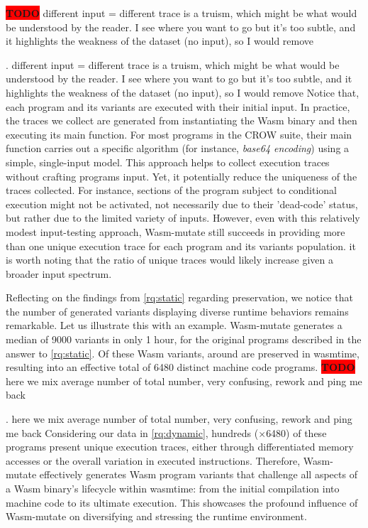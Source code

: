 \documentclass[sigplan,screen]{acmart}
\newcommand*\badge[1]{ \colorbox{red}{\color{white}#1}}
\newcommand{\tool}{Wasm-mutate\xspace}
\newcommand{\wasm}{Wasm\xspace}
\newcommand{\todo}[1]{%
\refstepcounter{todo}
\noindent\textbf{\badge{TODO}} {\color{red}#1}
\addcontentsline{td}{todo}
{\color{red}\thesection.\thetodo\xspace #1}}
\begin{document}
\todo{different input = different trace is a truism, which might be what would be understood by the reader. I see where you want to go but it's too subtle, and it highlights the weakness of the dataset (no input), so I would remove }
Notice that, each program and its variants are executed with their initial input.
In practice, the traces we collect are generated from instantiating the \wasm binary and then executing its main function. 
For most programs in the CROW suite, their main function carries out a specific algorithm (for instance, \emph{base64 encoding}) using a simple, single-input model. 
This approach helps to collect execution traces without crafting programs input.
Yet, it potentially reduce the uniqueness of the traces collected. 
For instance, sections of the program subject to conditional execution might not be activated, not necessarily due to their 'dead-code' status, but rather due to the limited variety of inputs. 
However, even with this relatively modest input-testing approach, \tool still succeeds in providing more than one unique execution trace for each program and its variants population.
it is worth noting that the ratio of unique traces would likely increase given a broader input spectrum.

Reflecting on the findings from \ref{rq:static} regarding preservation, we notice that the number of generated variants displaying diverse runtime behaviors remains remarkable. 
Let us illustrate this with an example.
\tool generates a median of 9000 variants in only 1 hour, for the original programs described in the answer to \ref{rq:static}. 
Of these \wasm variants, around \preserved are preserved in wasmtime, resulting into an effective total of 6480 distinct machine code programs.
\todo{here we mix average number of total number, very confusing, rework and ping me back}
Considering our data in \ref{rq:dynamic}, hundreds (\memratio$\times$6480) of these programs present unique execution traces, either through differentiated memory accesses or the overall variation in executed instructions. 
Therefore, \tool effectively generates \wasm program variants that challenge all aspects of a \wasm binary's lifecycle within wasmtime: from the initial compilation into machine code to its ultimate execution. 
This showcases the profound influence of \tool on diversifying and stressing the runtime environment.
\end{document}
